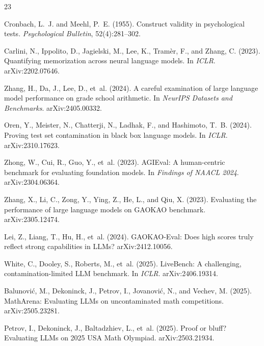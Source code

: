 \documentclass[11pt,UTF8]{ctexart}
\theoremstyle{definition}
\begin{document}
\begin{thebibliography}{23}
\small\setlength{\itemsep}{2pt}

Cronbach, L.~J. and Meehl, P.~E. (1955). Construct validity in
psychological tests. \emph{Psychological Bulletin}, 52(4):281--302.

Carlini, N., Ippolito, D., Jagielski, M., Lee, K., Tram\`er, F., and
Zhang, C. (2023). Quantifying memorization across neural language models.
In \emph{ICLR}. arXiv:2202.07646.

Zhang, H., Da, J., Lee, D., et~al. (2024). A careful examination of
large language model performance on grade school arithmetic. In
\emph{NeurIPS Datasets and Benchmarks}. arXiv:2405.00332.

Oren, Y., Meister, N., Chatterji, N., Ladhak, F., and Hashimoto, T.~B.
(2024). Proving test set contamination in black box language models. In
\emph{ICLR}. arXiv:2310.17623.

Zhong, W., Cui, R., Guo, Y., et~al. (2023). {AGIEval}: A human-centric
benchmark for evaluating foundation models. In \emph{Findings of NAACL
2024}. arXiv:2304.06364.

Zhang, X., Li, C., Zong, Y., Ying, Z., He, L., and Qiu, X. (2023).
Evaluating the performance of large language models on {GAOKAO}
benchmark. arXiv:2305.12474.

Lei, Z., Liang, T., Hu, H., et~al. (2024). {GAOKAO-Eval}: Does high
scores truly reflect strong capabilities in {LLMs}? arXiv:2412.10056.

White, C., Dooley, S., Roberts, M., et~al. (2025). {LiveBench}: A
challenging, contamination-limited {LLM} benchmark. In \emph{ICLR}.
arXiv:2406.19314.

Balunovi\'c, M., Dekoninck, J., Petrov, I., Jovanovi\'c, N., and
Vechev, M. (2025). {MathArena}: Evaluating {LLMs} on uncontaminated math
competitions. arXiv:2505.23281.

Petrov, I., Dekoninck, J., Baltadzhiev, L., et~al. (2025). Proof or
bluff? {Evaluating} {LLMs} on 2025 {USA} {Math} {Olympiad}.
arXiv:2503.21934.


\end{thebibliography}
\end{document}

